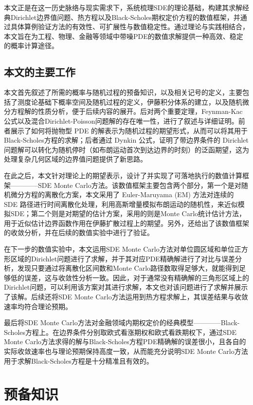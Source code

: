\documentclass[UTF8，12pt]{ctexart}
\numberwithin{equation}{section}
\begin{document}
本文正是在这一历史脉络与现实需求下，系统梳理SDE的理论基础，构建其求解经典Dirichlet边界值问题、热方程以及Black-Scholes期权定价方程的数值框架，并通过具体算例验证方法的有效性、可扩展性与数值稳定性。通过理论与实践相结合，本文旨在为工程、物理、金融等领域中带噪PDE的数值求解提供一种高效、稳定的概率计算途径。

\subsection{本文的主要工作}

本文首先叙述了所需的概率与随机过程的预备知识，以及相关记号的定义，主要包括了测度论基础下概率空间及随机过程的定义，伊藤积分体系的建立，以及随机微分方程解的性质分析，便于后续内容的展开。后对两个重要定理，Feynman-Kac公式以及混合Dirichlet-Poisson问题解的存在唯一性，进行了叙述与详细证明。前者展示了如何将抛物型 PDE 的解表示为随机过程的期望形式，从而可以将其用于Black-Scholes方程的求解；后者通过 Dynkin 公式，证明了带边界条件的 Dirichlet 问题解可以转化为随机停时（如布朗运动首次到达边界的时刻）的泛函期望，这为处理复杂几何区域的边界值问题提供了新思路。

在此之后，本文针对理论上的期望表示，设计了并实现了可落地执行的数值计算框架————SDE Monte Carlo方法。该数值框架主要包含两个部分，第一个是对随机微分方程的离散化方案，本文采用了 Euler-Maruyama (EM) 方法对连续的 SDE 路径进行时间离散化处理，利用高斯增量模拟布朗运动的随机性，来近似模拟SDE；第二个则是对期望的估计方案，采用的则是Monte Carlo统计估计方法，用于近似估计边界函数作用在伊藤扩散过程上的期望。另外，还给出了该数值框架的收敛分析，并在后续的数值实验中进行了验证。

在下一步的数值实验中，本文运用SDE Monte Carlo方法对单位圆区域和单位正方形区域的Dirichlet问题进行了求解，并于其对应PDE精确解进行了对比与误差分析，发现只要通过将离散化区间数和Monte Carlo路径数取得足够大，就能得到足够低的误差，这与收敛性分析一致。因此，对于通常没有精确解的三角形区域上的Dirichlet问题，可以利用该方案对其进行求解，本文也对该问题进行了求解并展示了该解。后续还将SDE Monte Carlo方法运用到热方程求解上，其误差结果与收敛速率均符合理论预期。

最后将SDE Monte Carlo方法对金融领域内期权定价的经典模型————Black-Scholes方程上。在边界条件分别取欧式看涨期权和欧式看跌期权下，通过SDE Monte Carlo方法求得的解与Black-Scholes方程PDE精确解的误差很小，且各自的实际收敛速率也与理论预期保持高度一致，从而能充分说明SDE Monte Carlo方法用于求解Black-Scholes方程是十分精准且有效的。
\newpage

\section{预备知识}
\end{document}
